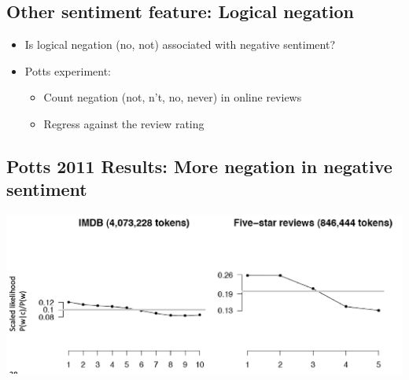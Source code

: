 \documentclass[11pt]{article}
\theoremstyle{definition}
\begin{document}
\subsection{Other sentiment feature: Logical negation}
\begin{itemize}
  \item Is logical negation (no, not) associated with negative
  sentiment?
  \item Potts experiment:
  \begin{itemize}
    \item Count negation (not, n’t, no, never) in online reviews
    \item Regress against the review rating
  \end{itemize}
\end{itemize}

\subsection{Potts 2011 Results: More negation in negative sentiment}
\includegraphics[width=\textwidth]{17.png}
\end{document}
